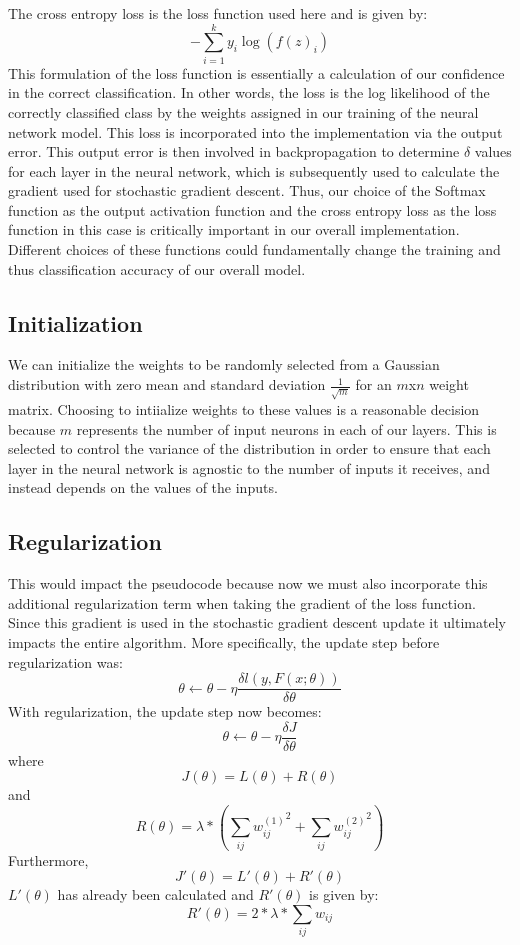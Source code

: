 \documentclass{article}
\begin{document}
The cross entropy loss is the loss function used here and is given by:
$$-\sum_{i=1}^k y_i \log(f(z)_i)$$
This formulation of the loss function is essentially a calculation of our confidence in the correct classification. In other words, the loss is the log likelihood of the correctly classified class by the weights assigned in our training of the neural network model. This loss is incorporated into the implementation via the output error. This output error is then involved in backpropagation to determine $\delta$ values for each layer in the neural network, which is subsequently used to calculate the gradient used for stochastic gradient descent. Thus, our choice of the Softmax function as the output activation function and the cross entropy loss as the loss function in this case is critically important in our overall implementation. Different choices of these functions could fundamentally change the training and thus classification accuracy of our overall model.

\subsection{Initialization}
We can initialize the weights to be randomly selected from a Gaussian distribution with zero mean and standard deviation $\frac{1}{\sqrt{m}}$ for an $m$x$n$ weight matrix. Choosing to intiialize weights to these values is a reasonable decision because $m$ represents the number of input neurons in each of our layers. This is selected to control the variance of the distribution in order to ensure that each layer in the neural network is agnostic to the number of inputs it receives, and instead depends on the values of the inputs.

\subsection{Regularization}
This would impact the pseudocode because now we must also incorporate this additional regularization term when taking the gradient of the loss function. Since this gradient is used in the stochastic gradient descent update it ultimately impacts the entire algorithm. More specifically, the update step before regularization was:
$$\theta \leftarrow \theta - \eta \frac{\delta l(y,F(x;\theta))}{\delta \theta}$$
With regularization, the update step now becomes:
$$\theta \leftarrow \theta - \eta \frac{\delta J}{\delta \theta}$$
where
$$J(\theta) = L(\theta) + R(\theta)$$
and
$$R(\theta) = \lambda *(\sum_{ij} {w_{ij}^{(1)}}^2 + \sum_{ij} {w_{ij}^{(2)}}^2)$$
Furthermore,
$$J'(\theta) = L'(\theta) + R'(\theta)$$
$L'(\theta)$ has already been calculated and $R'(\theta)$ is given by:
$$R'(\theta) = 2* \lambda * \sum_{ij} w_{ij}$$
\end{document}
